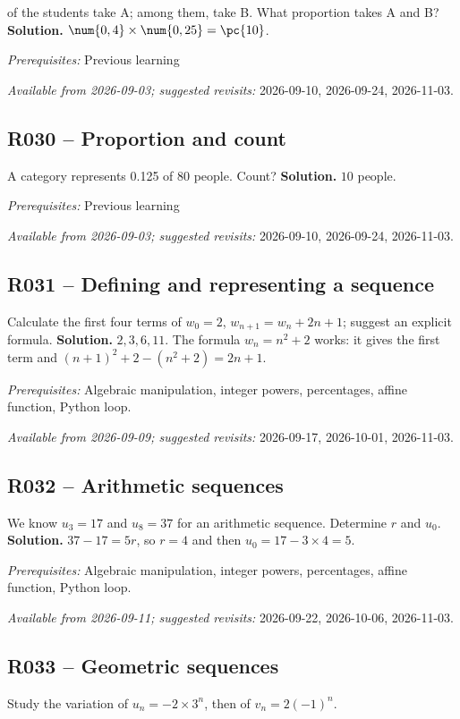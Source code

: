  of the students take A; among them,  take B. What proportion takes A and B?
\ifmxteacher\textbf{Solution.} $\num{0,4}\times\num{0,25}=\pc{10}$.\par\textit{Prerequisites:} Previous learning\par\textit{Available from 2026-09-03; suggested revisits:} 2026-09-10, 2026-09-24, 2026-11-03.\fi
{}\subsection*{R030 -- Proportion and count}\label{R030}
A category represents \num{0,125} of 80 people. Count?
\ifmxteacher\textbf{Solution.} $10$ people.\par\textit{Prerequisites:} Previous learning\par\textit{Available from 2026-09-03; suggested revisits:} 2026-09-10, 2026-09-24, 2026-11-03.\fi
{}\subsection*{R031 -- Defining and representing a sequence}\label{R031}
Calculate the first four terms of $w_0=2$, $w_{n+1}=w_n+2n+1$; suggest an explicit formula.
\ifmxteacher\textbf{Solution.} $2,3,6,11$. The formula $w_n=n^2+2$ works: it gives the first term and $(n+1)^2+2-(n^2+2)=2n+1$.\par\textit{Prerequisites:} Algebraic manipulation, integer powers, percentages, affine function, Python loop.\par\textit{Available from 2026-09-09; suggested revisits:} 2026-09-17, 2026-10-01, 2026-11-03.\fi
{}\subsection*{R032 -- Arithmetic sequences}\label{R032}
We know $u_3=17$ and $u_8=37$ for an arithmetic sequence. Determine $r$ and $u_0$.
\ifmxteacher\textbf{Solution.} $37-17=5r$, so $r=4$ and then $u_0=17-3\times4=5$.\par\textit{Prerequisites:} Algebraic manipulation, integer powers, percentages, affine function, Python loop.\par\textit{Available from 2026-09-11; suggested revisits:} 2026-09-22, 2026-10-06, 2026-11-03.\fi
{}\subsection*{R033 -- Geometric sequences}\label{R033}
Study the variation of $u_n=-2\times3^n$, then of $v_n=2(-1)^n$.
